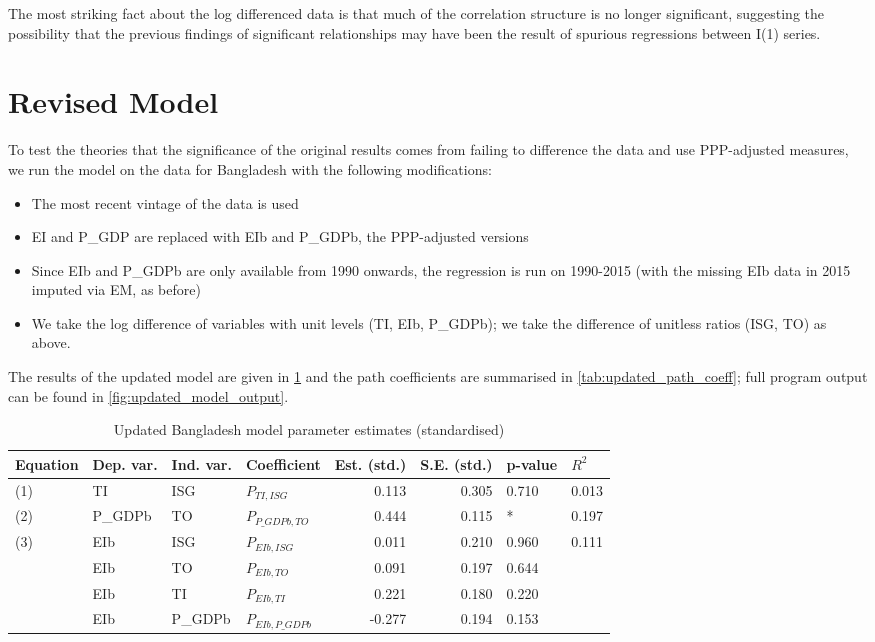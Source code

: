 \documentclass[11pt,a4paper]{article}
\begin{document}
The most striking fact about the log differenced data is that much of the correlation structure is no longer significant, suggesting the possibility that the previous findings of significant relationships may have been the result of spurious regressions between I(1) series.

\section{Revised Model}\label{sec:revised_model}

To test the theories that the significance of the original results comes from failing to difference the data and use PPP-adjusted measures, we run the model on the data for Bangladesh with the following modifications:
\begin{itemize}
\item The most recent vintage of the data is used
\item EI and P\_GDP are replaced with EIb and P\_GDPb, the PPP-adjusted versions
\item Since EIb and P\_GDPb are only available from 1990 onwards, the regression is run on 1990-2015 (with the missing EIb data in 2015 imputed via EM, as before)
\item We take the log difference of variables with unit levels (TI, EIb, P\_GDPb); we take the difference of unitless ratios (ISG, TO) as above. 
\end{itemize}

The results of the updated model are given in \cref{tab:updated_estimates} and the path coefficients are summarised in \cref{tab:updated_path_coeff}; full program output can be found in  \cref{fig:updated_model_output}.

\begin{table}[tbp]
\centering
\begin{adjustbox}{max width=\textwidth}
\begin{tabular}{llllrrll}
\toprule
Equation & Dep. var. & Ind. var. &        Coefficient &  Est. (std.) &  S.E. (std.) & p-value & $R^{2}$ \\
\midrule
     (1) &        TI &       ISG &       $P_{TI,ISG}$ &        0.113 &        0.305 &   0.710 &   0.013 \\
     (2) &   P\_GDPb &        TO &   $P_{P\_GDPb,TO}$ &        0.444 &        0.115 &       * &   0.197 \\
     (3) &       EIb &       ISG &      $P_{EIb,ISG}$ &        0.011 &        0.210 &   0.960 &   0.111 \\
         &       EIb &        TO &       $P_{EIb,TO}$ &        0.091 &        0.197 &   0.644 &         \\
         &       EIb &        TI &       $P_{EIb,TI}$ &        0.221 &        0.180 &   0.220 &         \\
         &       EIb &   P\_GDPb &  $P_{EIb,P\_GDPb}$ &       -0.277 &        0.194 &   0.153 &         \\
\bottomrule
\end{tabular}
\end{adjustbox}
\caption{Updated Bangladesh model parameter estimates (standardised)}
\label{tab:updated_estimates}
\end{table}
\end{document}

